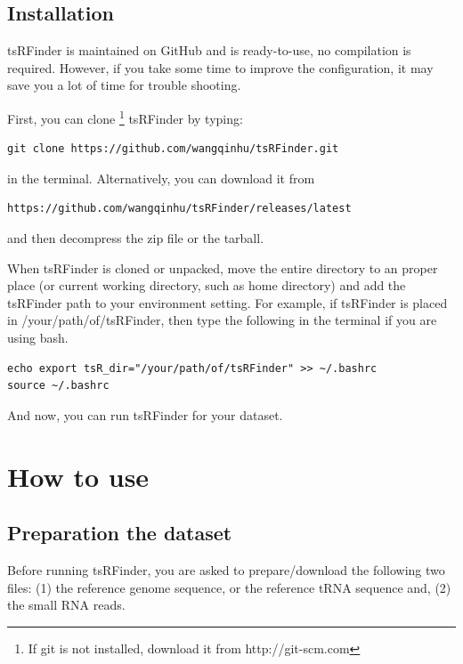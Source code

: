 \documentclass[11pt, a4paper]{article}
\begin{document}
\subsection{Installation}

tsRFinder is maintained on GitHub and is ready-to-use, no compilation is required. However, if you take some time to improve the configuration, it may save you a lot of time for trouble shooting.

First, you can clone \footnote{If git is not installed, download it from http://git-scm.com} tsRFinder by typing:

{\small \begin{verbatim}
git clone https://github.com/wangqinhu/tsRFinder.git
\end{verbatim}}

in the terminal. Alternatively, you can download it from

{\small \begin{verbatim}
https://github.com/wangqinhu/tsRFinder/releases/latest
\end{verbatim}
}

and then decompress the zip file or the tarball.

When tsRFinder is cloned or unpacked, move the entire directory to an proper place (or current working directory, such as home directory) and add the tsRFinder path to your environment setting. For example, if tsRFinder is placed in /your/path/of/tsRFinder, then type the following in the terminal if you are using bash.

{\small \begin{verbatim}
echo export tsR_dir="/your/path/of/tsRFinder" >> ~/.bashrc
source ~/.bashrc
\end{verbatim}}

And now, you can run tsRFinder for your dataset.

\section{How to use}

\subsection{Preparation the dataset}

Before running tsRFinder, you are asked to prepare/download the following two files: (1) the reference genome sequence, or the reference tRNA sequence and, (2) the small RNA reads.
\end{document}
